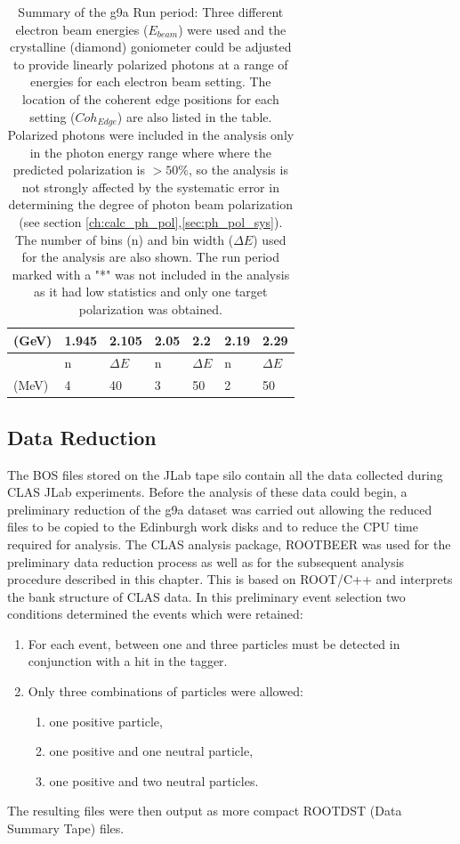 \begin{table}
\begin{center}
\begin{tabular}{ |l||l|l||l|l||l|l||l|l||}
      \multicolumn{3}{|l||}{(GeV)} & 1.945 & 2.105 & 2.05 & 2.2 & 2.19 & 2.29 \\
      \hline
      \multicolumn{3}{|l||}{} & n  &  $\Delta E$ & n  &  $\Delta E$ & n  &  $\Delta E$ \\
      \multicolumn{3}{|l||}{(MeV)} & 4 & 40 & 3 & 50 & 2 & 50  \\
      \hline
    \end{tabular}
  \end{center}
  \caption{Summary of the g9a Run period: Three different electron beam energies ($E_{beam}$) were used and the crystalline (diamond) goniometer could be adjusted to provide linearly polarized photons at a range of energies for each electron beam setting. The location of the coherent edge positions for each setting ($Coh_{Edge}$) are also listed in the table. Polarized photons were included in the analysis only in the photon energy range where where the predicted polarization is $>50\%$, so the analysis is not strongly affected by the systematic error in determining  the degree of photon beam polarization (see section \ref{ch:calc_ph_pol},\ref{sec:ph_pol_sys}). The number of bins (n)  and bin width ($\Delta E$) used for the analysis are also shown. 
The run period marked with a "*" was not included in the analysis as it had low statistics and only one target polarization was obtained.} \label{tab:g9a_configs}
\end{table}

\subsection{Data Reduction}
The BOS files stored on the JLab tape silo contain all the data collected during CLAS JLab experiments. Before the analysis of these data could begin, a preliminary reduction of the g9a dataset was carried out allowing the reduced files to be copied to the Edinburgh work disks and to reduce the CPU time required for analysis. The CLAS analysis package, ROOTBEER \cite{rootbeer} was used for the preliminary data reduction process as well as for the subsequent analysis procedure described in this chapter. This is based on ROOT/C++ and interprets the bank structure of CLAS data. In this preliminary event selection two conditions determined the events which were retained:
\begin{enumerate}
\item  For each event, between one and three particles must be detected in conjunction with a hit in the tagger.
\item  Only three combinations of particles were allowed:
  \begin{enumerate}
  \item one positive particle,
  \item one positive and one neutral particle,
  \item one positive and two neutral particles.
  \end{enumerate}
\end{enumerate}
The resulting files were then output as more compact ROOTDST (Data Summary Tape) files.

